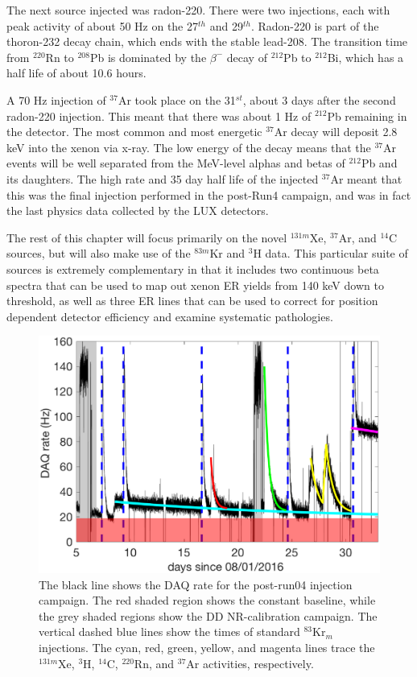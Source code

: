 {The next source injected was radon-220. There were two injections, each with peak activity of about 50 Hz on the 27$^{th}$ and 29$^{th}$. Radon-220 is part of the thoron-232 decay chain, which ends with the stable lead-208. The transition time from $^{220}$Rn to $^{208}$Pb is dominated by the $\beta^-$ decay of $^{212}$Pb to $^{212}$Bi, which has a half life of about 10.6 hours. 

A 70 Hz injection of $^{37}$Ar took place on the 31$^{st}$, about 3 days after the second radon-220 injection. This meant that there was about 1 Hz of $^{212}$Pb remaining in the detector. The most common and most energetic $^{37}$Ar decay will deposit 2.8 keV into the xenon via x-ray. The low energy of the decay means that the $^{37}$Ar events will be well separated from the MeV-level alphas and betas of $^{212}$Pb and its daughters. The high rate and 35 day half life of the injected $^{37}$Ar meant that this was the final injection performed in the post-Run4 campaign, and was in fact the last physics data collected by the LUX detectors.

The rest of this chapter will focus primarily on the novel $^{131m}$Xe, $^{37}$Ar, and $^{14}$C sources, but will also make use of the $^{83m}$Kr and $^{3}$H data. This particular suite of sources is extremely complementary in that it includes two continuous beta spectra that can be used to map out xenon ER yields from 140 keV down to threshold, as well as three ER lines that can be used to correct for position dependent detector efficiency and examine systematic pathologies.
\begin{figure}[h!]
\centering
\includegraphics[width=\textwidth]{Figures/post_Run4_DAQrate.eps}
\caption{The black line shows the DAQ rate for the post-run04 injection campaign. The red shaded region shows the constant baseline, while the grey shaded regions show the DD NR-calibration campaign. The vertical dashed blue lines show the times of standard $^{83}$Kr$_m$ injections. The cyan, red, green, yellow, and magenta lines trace the $^{131m}$Xe, $^{3}$H, $^{14}$C, $^{220}$Rn, and $^{37}$Ar activities, respectively.} 
\label{fig:DAQrate}
\end{figure}


}
